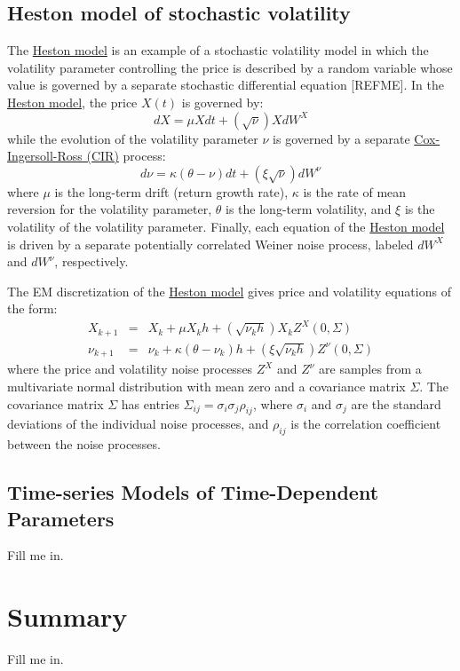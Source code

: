 \documentclass[11pt]{article}
\theoremstyle{definition}
\begin{document}
\subsection*{Heston model of stochastic volatility}
The \href{https://en.wikipedia.org/wiki/Heston_model}{Heston model}
is an example of a stochastic volatility model in which the volatility parameter 
controlling the price is described by a random variable whose value is governed by a separate stochastic differential equation [REFME]. 
In the \href{https://en.wikipedia.org/wiki/Heston_model}{Heston model}, the price $X(t)$ is governed by:
\begin{equation*}\label{eqn-price-heston-model}
dX = \mu{X}dt + \left(\sqrt{\nu}\right)X{dW}^{X}
\end{equation*}
while the evolution of the volatility parameter $\nu$ is governed by a separate \href{https://en.wikipedia.org/wiki/Cox-Ingersoll-Ross_model}{Cox-Ingersoll-Ross (CIR)} process:
\begin{equation*}\label{eqn-vol-heston-model}
d\nu = \kappa\left(\theta - \nu\right)dt +\left(\xi\sqrt{\nu}\right)dW^{\nu}
\end{equation*}
where $\mu$ is the long-term drift (return growth rate), 
$\kappa$ is the rate of mean reversion for the volatility parameter,
$\theta$ is the long-term volatility, and $\xi$ is the volatility of the volatility parameter.
Finally, each equation of the \href{https://en.wikipedia.org/wiki/Heston_model}{Heston model} 
is driven by a separate potentially correlated Weiner noise process, labeled $dW^{X}$ and $dW^{\nu}$, respectively.

\begin{definition}\label{defn-heston-model}
The EM discretization of the \href{https://en.wikipedia.org/wiki/Heston_model}{Heston model} gives 
price and volatility equations of the form:
\begin{eqnarray*}\label{eqn-heston-price-em-discrete}
X_{k+1} & = & X_{k} + \mu{X_{k}}h + \left(\sqrt{\nu_{k}h}\right)X_{k}Z^{X}(0,\Sigma)\\
\nu_{k+1} & = & \nu_{k} + \kappa\left(\theta - \nu_{k}\right)h + \left(\xi\sqrt{\nu_{k}h}\right)Z^{\nu}(0,\Sigma)
\end{eqnarray*}
where the price and volatility noise processes $Z^{X}$ and $Z^{\nu}$ are samples 
from a multivariate normal distribution with mean zero and a covariance matrix $\Sigma$.
The covariance matrix $\Sigma$ has entries $\Sigma_{ij}=\sigma_{i}\sigma_{j}\rho_{ij}$, where 
$\sigma_{i}$ and $\sigma_{j}$ are the standard deviations of the individual noise processes,
and $\rho_{ij}$ is the correlation coefficient between the noise processes.
\end{definition}

\subsection*{Time-series Models of Time-Dependent Parameters}
Fill me in.

\section*{Summary}
Fill me in. 



\clearpage
\printindex
\end{document}

